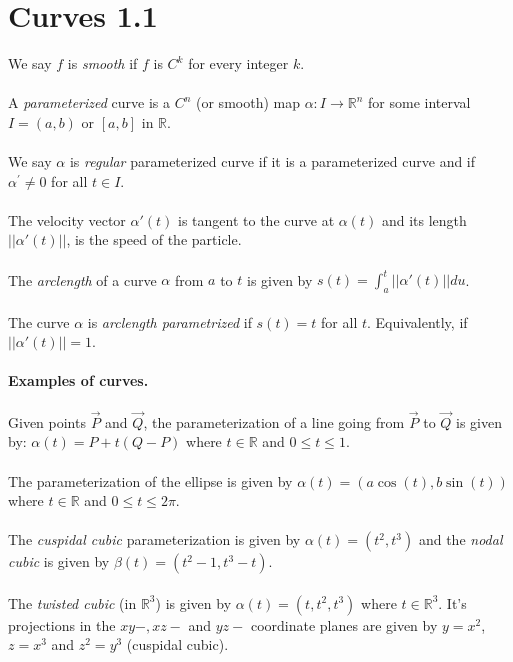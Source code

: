 \documentclass{article}
\begin{document}
    \section*{Curves 1.1}
    We say $f$ is \textit{smooth} if $f$ is $C^k$ for every integer $k$.\\\\
    A \textit{parameterized} curve is a $C^n$ (or smooth) map $\alpha: I \to \mathbb{R}^n$ for some interval $I = (a,b)$
        or $[a,b]$ in $\mathbb{R}$.\\\\
    We say $\alpha$ is \textit{regular} parameterized curve if it is a parameterized curve and if $\alpha^{'}\neq 0$ 
    for all $t\in I$.\\\\
    The velocity vector $\alpha'(t)$ is tangent to the curve at $\alpha(t)$ and its length $||\alpha'(t)||$, is the 
    speed of the particle.\\\\
    The \textit{arclength} of a curve $\alpha$ from $a$ to $t$ is given by $s(t) = \int_a^t ||\alpha'(t)||du$.\\\\
    The curve $\alpha$ is \textit{arclength parametrized} if $s(t) = t$ for all $t$. Equivalently, if $||\alpha'(t)|| = 1$.\\\\
    \textbf{Examples of curves.}\\\\
    Given points $\vec{P}$ and $\vec{Q}$, the parameterization of a line going from $\vec{P}$ to $\vec{Q}$ is given 
    by: $\alpha(t) = P + t(Q-P)$ where $t\in\mathbb{R}$ and $0\leq t\leq 1$.\\\\
    The parameterization of the ellipse is given by $\alpha(t) = (a\cos(t),b\sin(t))$ where $t\in\mathbb{R}$ and 
    $0\leq t\leq 2\pi$.\\\\
    The \textit{cuspidal cubic} parameterization is given by $\alpha(t) = (t^2,t^3)$ and the \textit{nodal cubic} is
    given by $\beta(t) = (t^2-1, t^3-t)$.\\\\
    The \textit{twisted cubic} (in $\mathbb{R}^3$) is given by $\alpha(t) = (t,t^2,t^3)$ where $t\in\mathbb{R}^3$. It's
    projections in the $xy-,xz-$ and $yz-$ coordinate planes are given by $y=x^2$, $z=x^3$ and $z^2=y^3$ (cuspidal cubic).\\\\
\end{document}
